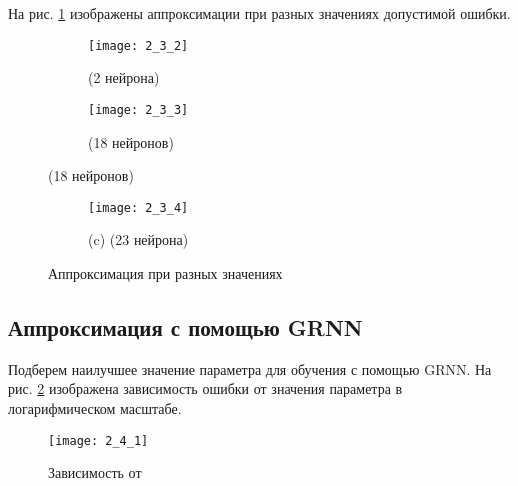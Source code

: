 На рис. \ref{fig:2_3_2} изображены аппроксимации при разных значениях допустимой ошибки.
\begin{figure}[H]
\begin{center}
	\begin{subfigure}{0.49\textwidth}
		\texttt{[image: 2\_3\_2]}
		\caption{ (2 нейрона)}
	\end{subfigure}
	\begin{subfigure}{0.49\textwidth}
		\texttt{[image: 2\_3\_3]}
		\caption{ (18 нейронов)}
	\end{subfigure}
\end{center}
\end{figure}
\begin{figure}[H]
\begin{center}
	\begin{subfigure}{0.49\textwidth}
		\texttt{[image: 2\_3\_4]}
		\caption*{(c)  (23 нейрона)}
	\end{subfigure}
	\caption{Аппроксимация при разных значениях }
	\label{fig:2_3_2}
\end{center}
\end{figure}

\subsection{Аппроксимация с помощью GRNN}


Подберем наилучшее значение параметра  для обучения с помощью GRNN. На рис. \ref{fig:2_4_1} изображена зависимость ошибки  от значения параметра  в логарифмическом масштабе. 
\begin{figure}[H]
\begin{center}
	\texttt{[image: 2\_4\_1]}
	\caption{Зависимость  от }
	\label{fig:2_4_1}
\end{center}
\end{figure}

